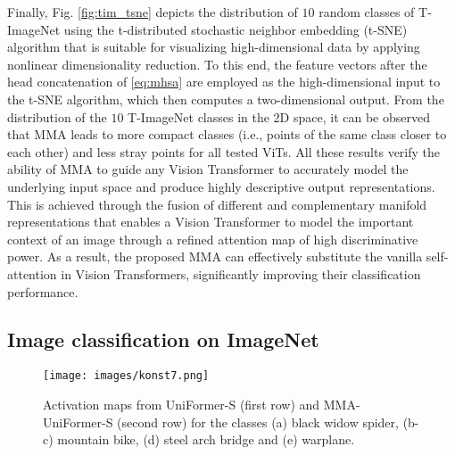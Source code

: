 \documentclass[10pt,twocolumn,letterpaper]{article}
\begin{document}
Finally, Fig. \ref{fig:tim_tsne} depicts the distribution of $10$ random classes of T-ImageNet using the t-distributed stochastic neighbor embedding (t-SNE) algorithm \cite{Author44} that is suitable for visualizing high-dimensional data by applying nonlinear dimensionality reduction. To this end, the feature vectors after the head concatenation of \eqref{eq:mhsa} are employed as the high-dimensional input to the t-SNE algorithm, which then computes a two-dimensional output. From the distribution of the $10$ T-ImageNet classes in the 2D space, it can be observed that MMA leads to more compact classes (i.e., points of the same class closer to each other) and less stray points for all tested ViTs. All these results verify the ability of MMA to guide any Vision Transformer to accurately model the underlying input space and produce highly descriptive output representations. This is achieved through the fusion of different and complementary manifold representations that enables a Vision Transformer to model the important context of an image through a refined attention map of high discriminative power. As a result, the proposed MMA can effectively substitute the vanilla self-attention in Vision Transformers, significantly improving their classification performance.

\subsection{Image classification on ImageNet}

\begin{figure}[t]
  \centering
  \texttt{[image: images/konst7.png]}
  \caption{Activation maps from UniFormer-S (first row) and MMA-UniFormer-S (second row) for the classes (a) black widow spider, (b-c) mountain bike, (d) steel arch bridge and (e) warplane.}
  \label{fig:imnet_vis}
\end{figure}
\end{document}
